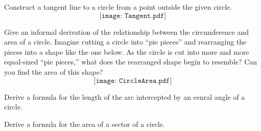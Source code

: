 \begin{prob}
Construct a tangent line to a circle from a point outside the given circle.
$$\texttt{[image: Tangent.pdf]}$$
\end{prob}

\begin{prob}
Give an informal derivation of the relationship between the circumference and area of a circle.  Imagine cutting a circle into ``pie pieces'' and rearranging the pieces into a shape like the one below.  As the circle is cut into more and more equal-sized ``pie pieces,'' what does the rearranged shape begin to resemble?  Can you find the area of this shape?  
$$\texttt{[image: CircleArea.pdf]}$$
\end{prob}

\begin{prob}
Derive a formula for the length of the arc intercepted by an cenral angle of a circle.  
\end{prob}

\begin{prob}
Derive a formula for the area of a sector of a circle.  
\end{prob}







